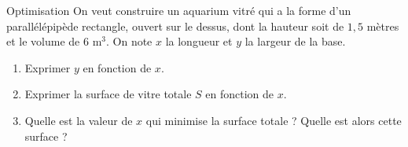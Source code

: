 \documentclass{beamer}
\begin{document}
\begin{frame}{Optimisation}
On veut construire un aquarium vitré qui a la forme d'un parallélépipède rectangle, ouvert sur le dessus, dont la hauteur soit de $1,5$ mètres et le volume de $6$ m${^3}$. On note $x$ la longueur et $y$ la largeur de la base.
\begin{enumerate}
	\item Exprimer $y$ en fonction de $x$.
	\item  Exprimer la surface de vitre totale $S$ en fonction de $x$.
	\item  Quelle est la valeur de $x$ qui minimise la surface totale ? Quelle est alors cette surface ?
\end{enumerate}
\end{frame}
\end{document}
